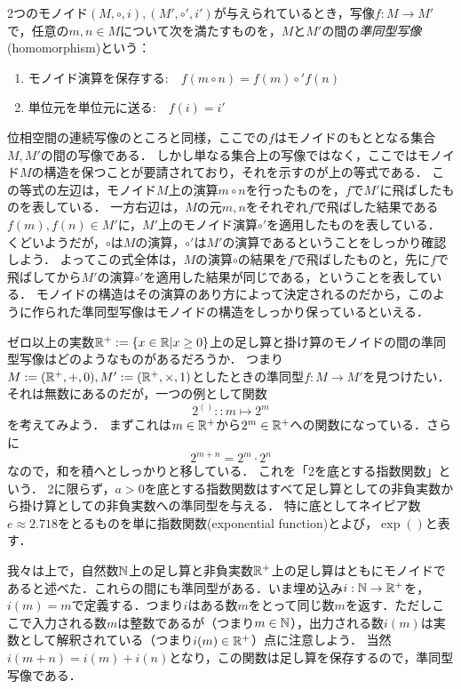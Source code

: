 \documentclass[11pt,a4paper, dvipdfmx]{jsarticle}
\begin{document}
\begin{dfn}[準同型]
    2つのモノイド$(M, \circ, i), (M', \circ', i')$が与えられているとき，写像$f:M \to M'$で，任意の$m,n \in M$について次を満たすものを，$M$と$M'$の間の\emph{準同型写像}(homomorphism)という：
    \begin{enumerate}
        \item モノイド演算を保存する: $\ \ \ f(m \circ n) = f(m) \circ' f(n)$
        \item 単位元を単位元に送る: $\ \ \ f(i) = i'$
    \end{enumerate}
\end{dfn}

位相空間の連続写像のところと同様，ここでの$f$はモノイドのもととなる集合$M,M'$の間の写像である．
しかし単なる集合上の写像ではなく，ここではモノイド$M$の構造を保つことが要請されており，それを示すのが上の等式である．
この等式の左辺は，モノイド$M$上の演算$m \circ n$を行ったものを，$f$で$M'$に飛ばしたものを表している．
一方右辺は，$M$の元$m,n$をそれぞれ$f$で飛ばした結果である$f(m), f(n) \in M'$に，$M'$上のモノイド演算$\circ'$を適用したものを表している．
くどいようだが，$\circ$は$M$の演算，$\circ'$は$M'$の演算であるということをしっかり確認しよう．
よってこの式全体は，$M$の演算$\circ$の結果を$f$で飛ばしたものと，先に$f$で飛ばしてから$M'$の演算$\circ'$を適用した結果が同じである，ということを表している．
モノイドの構造はその演算のあり方によって決定されるのだから，このように作られた準同型写像はモノイドの構造をしっかり保っているといえる．


ゼロ以上の実数$\mathbb{R}^+ := \{x \in \mathbb{R} | x \geq 0 \}$上の足し算と掛け算のモノイドの間の準同型写像はどのようなものがあるだろうか．
つまり$M := (\mathbb{R}^+, +, 0), M' := (\mathbb{R}^+, \times, 1)$としたときの準同型$f:M \to M'$を見つけたい．
それは無数にあるのだが，一つの例として関数
\[ 2^{()} :: m \mapsto 2^m \]
を考えてみよう．
まずこれは$m \in \mathbb{R}^+$から$2^m \in \mathbb{R}^+$への関数になっている．さらに
\[ 2^{m + n} = 2^m \cdot 2^n \]
なので，和を積へとしっかりと移している．
これを「2を底とする指数関数」という．
2に限らず，$a>0$を底とする指数関数はすべて足し算としての非負実数から掛け算としての非負実数への準同型を与える．
特に底としてネイピア数$e\approx 2.718$をとるものを単に指数関数(exponential function)とよび，$\exp()$と表す．

\begin{example}
    我々は上で，自然数$\mathbb{N}$上の足し算と非負実数$\mathbb{R}^+$上の足し算はともにモノイドであると述べた．これらの間にも準同型がある．いま埋め込み$i:\mathbb{N} \to \mathbb{R}^+$を，$i(m)=m$で定義する．つまり$i$はある数$m$をとって同じ数$m$を返す．ただしここで入力される数$m$は整数であるが（つまり$m \in \mathbb{N}$），出力される数$i(m)$は実数として解釈されている（つまり$i(m) \in \mathbb{R}^+$）点に注意しよう．
    当然$i(m+n) = i(m)+i(n)$となり，この関数は足し算を保存するので，準同型写像である．
\end{example} 
\end{document}
